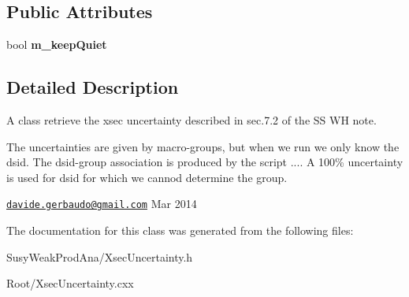 \subsection*{Public Attributes}
\begin{DoxyCompactItemize}
\item 
\hypertarget{classXsecUncertainty_a957191d0071eca2474793757fdd2a094}{
bool {\bfseries m\_\-keepQuiet}}
\label{classXsecUncertainty_a957191d0071eca2474793757fdd2a094}

\end{DoxyCompactItemize}


\subsection{Detailed Description}
A class retrieve the xsec uncertainty described in sec.7.2 of the SS WH note.

The uncertainties are given by macro-\/groups, but when we run we only know the dsid. The dsid-\/group association is produced by the script .... A 100\% uncertainty is used for dsid for which we cannod determine the group.

\href{mailto:davide.gerbaudo@gmail.com}{\tt davide.gerbaudo@gmail.com} Mar 2014 

The documentation for this class was generated from the following files:\begin{DoxyCompactItemize}
\item 
SusyWeakProdAna/XsecUncertainty.h\item 
Root/XsecUncertainty.cxx\end{DoxyCompactItemize}
